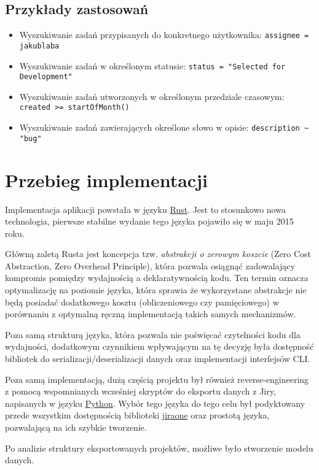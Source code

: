 \subsection{Przykłady zastosowań}
\begin{itemize}
    \item Wyszukiwanie zadań przypisanych do konkretnego użytkownika: \texttt{assignee = jakublaba}
    \item Wyszukiwanie zadań w określonym statusie: \texttt{status = "Selected for Development"}
    \item Wyszukiwanie zadań utworzonych w określonym przedziale czasowym: \texttt{created >= startOfMonth()}
    \item Wyszukiwanie zadań zawierających określone słowo w opisie: \texttt{description \~{} "bug"}
\end{itemize}

\section{Przebieg implementacji}
Implementacja aplikacji powstała w języku \href{https://www.rust-lang.org/}{Rust}. Jest to stosunkowo nowa technologia, pierwsze stabilne wydanie tego języka pojawiło się w maju 2015 roku.

Główną zaletą Rusta jest koncepcja tzw. \textit{abstrakcji o zerowym koszcie} (Zero Cost Abstraction, Zero Overhead Principle), która pozwala
osiągnąć zadowalający kompromis pomiędzy wydajnością a deklaratywnością kodu. Ten termin oznacza optymalizację na poziomie języka, która sprawia że wykorzystane abstrakcje nie będą posiadać dodatkowego kosztu (obliczeniowego czy pamięciowego) w porównaniu
z optymalną ręczną implementacją takich samych mechanizmów.

Poza samą strukturą języka, która pozwala nie poświęcać czytelności kodu dla wydajności, dodatkowym czynnikiem wpływającym na tę decyzję była dostępność bibliotek do serializacji/deserializacji danych oraz implementacji interfejsów CLI. \cite{RustSerde} \cite{RustClap}

Poza samą implementacją, dużą częścią projektu był również reverse-engineering z pomocą wspomnianych wcześniej skryptów do eksportu danych z Jiry, napisanych w języku \href{https://www.python.org/}{Python}.
Wybór tego języka do tego celu był podyktowany przede wszystkim dostępnością biblioteki \href{https://pypi.org/project/jiraone/}{jiraone} oraz prostotą języka, pozwalającą na ich szybkie tworzenie.

Po analizie struktury eksportowanych projektów, możliwe było stworzenie modelu danych.

